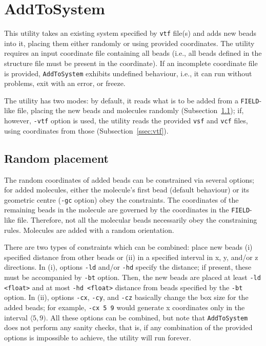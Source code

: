\section{AddToSystem} \label{sec:AddToSystem}

This utility takes an existing system specified by \texttt{vtf} file(s) and
adds new beads into it, placing them either randomly or using provided
coordinates. The utility requires an input coordinate file containing all
beads (i.e., all beads defined in the structure file must be present in the
coordinate). If an incomplete coordinate file is provided,
\texttt{AddToSystem} exhibits undefined behaviour, i.e., it can run without
problems, exit with an error, or freeze.

The utility has two modes: by default, it reads what is to be added from a
\texttt{FIELD}-like file, placing the new beads and molecules randomly
(Subsection~\ref{ssec:random}); if, however, \texttt{-vtf} option is used,
the utility reads the provided \texttt{vsf} and \texttt{vcf} files, using
coordinates from those (Subsection~\ref{ssec:vtf}).

\subsection{Random placement} \label{ssec:random}

The random coordinates of added beads can be constrained via several
options; for added molecules, either the molecule's first bead (default
behaviour) or its geometric centre (\texttt{-gc} option) obey the
constraints. The coordinates of the remaining beads in the molecule are
governed by the coordinates in the \texttt{FIELD}-like file. Therefore,
not all the molecular beads necessarily obey the constraining rules.
Molecules are added with a random orientation.

There are two types of constraints which can be combined: place new beads
(i) specified distance from other beads or (ii) in a specified interval in
x, y, and/or z directions. In (i), options \texttt{-ld} and/or \texttt{-hd}
specify the distance; if present, these must be accompanied by \texttt{-bt}
option.  Then, the new beads are placed at least \texttt{-ld <float>} and
at most \texttt{-hd <float>} distance from beads specified by the
\texttt{-bt} option. In (ii), options \texttt{-cx}, \texttt{-cy}, and
\texttt{-cz} basically change the box size for the added beads; for
example, \texttt{-cx 5 9} would generate x coordinates only in the interval
$\langle5,9)$. All these options can be combined, but note that
\texttt{AddToSystem} does not perform any sanity checks, that is, if any
combination of the provided options is impossible to achieve, the utility
will run forever.

